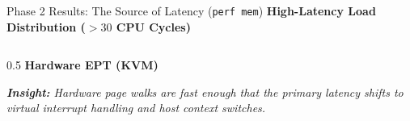 \documentclass[aspectratio=169]{beamer} %
\begin{document}
  \begin{frame}{Phase 2 Results: The Source of Latency (\texttt{perf mem})}
      \textbf{High-Latency Load Distribution ($>30$ CPU Cycles)}
      \vspace{0.2cm}

      \begin{columns}[T]
          \begin{column}{0.5\textwidth}
              \textbf{Hardware EPT (KVM)}
              \vspace{0.1cm}
              \begin{table}[]
                  \renewcommand{\arraystretch}{1.2}
              \end{table}
              \vspace{0.1cm}
              \footnotesize \textit{\textbf{Insight:} Hardware page walks are fast enough that the primary latency shifts to virtual interrupt handling and host context switches.}
          \end{column}


\end{columns}
\end{frame}
\end{document}
